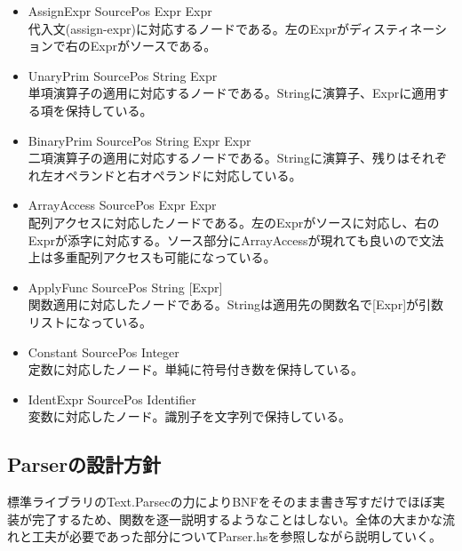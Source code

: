 \documentclass{jsarticle}
\begin{document}
\begin{itemize}
\item AssignExpr SourcePos Expr Expr \mbox{} \\
代入文(assign-expr)に対応するノードである。左のExprがディスティネーションで右のExprがソースである。
\item UnaryPrim SourcePos String Expr \mbox{} \\
単項演算子の適用に対応するノードである。Stringに演算子、Exprに適用する項を保持している。
\item BinaryPrim SourcePos String Expr Expr \mbox{} \\
二項演算子の適用に対応するノードである。Stringに演算子、残りはそれぞれ左オペランドと右オペランドに対応している。
\item ArrayAccess SourcePos Expr Expr \mbox{} \\
配列アクセスに対応したノードである。左のExprがソースに対応し、右のExprが添字に対応する。ソース部分にArrayAccessが現れても良いので文法上は多重配列アクセスも可能になっている。
\item ApplyFunc SourcePos String [Expr] \mbox{} \\
関数適用に対応したノードである。Stringは適用先の関数名で[Expr]が引数リストになっている。
\item Constant SourcePos Integer \mbox{} \\
定数に対応したノード。単純に符号付き数を保持している。
\item IdentExpr SourcePos Identifier \mbox{} \\
変数に対応したノード。識別子を文字列で保持している。
\end{itemize}
\subsection{Parserの設計方針}
標準ライブラリのText.Parsecの力によりBNFをそのまま書き写すだけでほぼ実装が完了するため、関数を逐一説明するようなことはしない。全体の大まかな流れと工夫が必要であった部分についてParser.hsを参照しながら説明していく。
\end{document}
